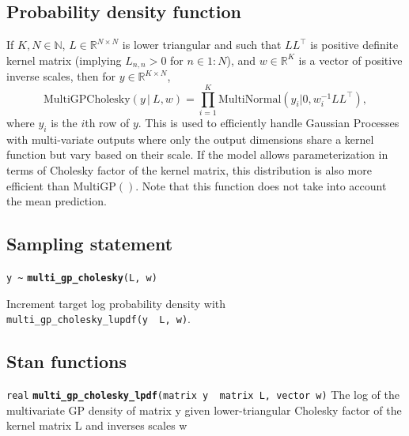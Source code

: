 \documentclass[
  10pt,
]{book}
\begin{document}
\hypertarget{probability-density-function-29}{%
\subsection{Probability density function}\label{probability-density-function-29}}

If \(K,N \in \mathbb{N}\), \(L \in \mathbb{R}^{N \times N}\) is lower
triangular and such that \(LL^{\top}\) is positive definite kernel
matrix (implying \(L_{n,n} > 0\) for \(n \in 1{:}N\)), and \(w \in \mathbb{R}^{K}\) is a vector of positive inverse scales, then for \(y \in \mathbb{R}^{K \times N}\), \[ \text{MultiGPCholesky}(y \, | \ L,w)
= \prod_{i=1}^{K} \text{MultiNormal}(y_i|0,w_i^{-1} LL^{\top}), \]
where \(y_i\) is the \(i\)th row of \(y\). This is used to efficiently
handle Gaussian Processes with multi-variate outputs where only the
output dimensions share a kernel function but vary based on their
scale. If the model allows parameterization in terms of Cholesky
factor of the kernel matrix, this distribution is also more efficient
than \(\text{MultiGP}()\). Note that this function does not take into
account the mean prediction.

\hypertarget{sampling-statement-53}{%
\subsection{Sampling statement}\label{sampling-statement-53}}

\texttt{y\ \textasciitilde{}} \textbf{\texttt{multi\_gp\_cholesky}}\texttt{(L,\ w)}

Increment target log probability density with \texttt{multi\_gp\_cholesky\_lupdf(y\ \textbar{}\ L,\ w)}.

\hypertarget{stan-functions-52}{%
\subsection{Stan functions}\label{stan-functions-52}}


\texttt{real} \textbf{\texttt{multi\_gp\_cholesky\_lpdf}}\texttt{(matrix\ y\ \textbar{}\ matrix\ L,\ vector\ w)}\newline
The log of the multivariate GP density of matrix y given
lower-triangular Cholesky factor of the kernel matrix L and inverses
scales w
\end{document}
